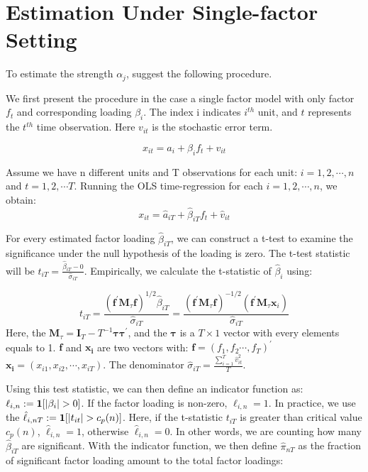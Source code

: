 	\section{Estimation Under Single-factor Setting}\label{strength_one_factor_estimation}
To estimate the strength $\alpha_j$,  suggest the following procedure.

We first present the procedure in the case a single factor model with only factor $f_t$ and corresponding loading $\beta_{i}$.
The index i indicates $i^{th}$ unit, and $t$ represents the $t^{th}$ time observation.
Here $v_{it}$ is the stochastic error term.

\[  x_{it} = a_{i} +  \beta_{i}f_{t} + v_{it} \tag{2} \label{estimation_model}\]

Assume we have n different units and T observations for each unit: $i = 1, 2,  \cdots, n$ and $t = 1,2, \cdots T$.
Running the OLS time-regression for each $i = 1,2, \cdots, n$, we obtain:
\[   x_{it} = \hat{a}_{iT} +  \hat{\beta}_{iT}f_{t} + \hat{v}_{it}  \]

For every estimated factor loading $\hat{\beta}_{iT}$, we can construct a t-test to examine the significance under the null hypothesis of the loading is zero.
The t-test statistic will be $t_{iT} = \frac{\hat{\beta}_{iT} - 0}{\hat{\sigma}_{iT}}$.  
Empirically, we calculate the t-statistic of $\hat{\beta}_i$ using:

\[t_{i T}=\frac{\left(\bm{f}^{\prime} \bm{M}_{\tau} \bm{f}\right)^{1 / 2} \hat{\beta}_{i T}}{\hat{\sigma}_{i T}}=\frac{\left(\bm{f}^{\prime} \bm{M}_{\tau} \bm{f}\right)^{-1 / 2}\left(\bm{f}^{\prime} \bm{M}_{\tau} \bm{x}_{i}\right)}{\hat{\sigma}_{i T}} \tag{3} \label{test_statistic} \]
Here, the $\bm{M}_{\tau} = \bm{I}_T - T^{-1}\bm{\tau}\bm{\tau^\prime}$, and the $\bm{\tau}$ is a $T\times 1$ vector with every elements equals to 1.
$\bm{f}$ and $\bm{x_i}$ are two vectors with: $\bm{f} = (f_1, f_2 \cdots, f_T)^{\prime}$   $\bm{x_i} = (x_{i1}, x_{i2}, \cdots, x_{iT})$.
The denominator $\hat{\sigma}_{iT} = \frac{\sum_{i=1}^{T} \hat{v}^2_{it} }{T}$.

Using this test statistic, we can then define an indicator function as: $\ell_{i,n} := {\bf1}[|\beta_i|>0]$.
If the factor loading is non-zero, $\ell_{i,n} = 1$.
In practice, we use the $\hat{\ell}_{i,nT} := {\bf1}[|t_{it}|>c_p(n)]$.
Here, if the t-statistic $t_{iT}$ is greater than critical value $c_p(n)$,  $\hat{\ell}_{i,n} = 1$, otherwise $\hat{\ell}_{i,n} = 0$.
In other words, we are counting how many $\hat{\beta}_{iT}$ are significant.
With the indicator function, we then define $\hat{\pi}_{nT}$ as the fraction of significant factor loading amount to the total factor loadings:

